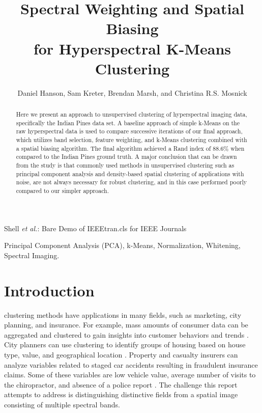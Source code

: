 \documentclass[journal]{IEEEtran}
\begin{document}
\title{Spectral Weighting and Spatial Biasing\\ for Hyperspectral K-Means Clustering}


\author{Daniel Hanson, Sam Kreter, Brendan Marsh, and Christina R.S. Mosnick}

{Shell \MakeLowercase{\textit{et al.}}: Bare Demo of IEEEtran.cls for IEEE Journals}

\maketitle

\begin{abstract}
Here we present an approach to unsupervised clustering of hyperspectral imaging data, specifically the Indian Pines data set. A baseline approach of simple k-Means on the raw hyperspectral data is used to compare successive iterations of our final approach, which utilizes band selection, feature weighting, and k-Means clustering combined with a spatial biasing algorithm. The final algorithm achieved a Rand index of 88.6\% when compared to the Indian Pines ground truth. A major conclusion that can be drawn from the study is that commonly used methods in unsupervised clustering such as principal component analysis and density-based spatial clustering of applications with noise, are not always necessary for robust clustering, and in this case performed poorly compared to our simpler approach.
\end{abstract}

\begin{IEEEkeywords}
    Principal Component Analysis (PCA), k-Means, Normalization, Whitening, Spectral Imaging.
\end{IEEEkeywords}

\IEEEpeerreviewmaketitle

\section{Introduction}

 clustering methods have applications in many fields, such as marketing, city planning, and insurance. For example, mass amounts of consumer data can be aggregated and clustered to gain insights into customer behaviors and trends \cite{ClusterTutorial}. City planners can use clustering to identify groups of housing based on house type, value, and geographical location \cite{ClusterTutorial}. Property and casualty insurers can analyze variables related to staged car accidents resulting in fraudulent insurance claims. Some of these variables are low vehicle value, average number of visits to the chiropractor, and absence of a police report \cite{FraudAnalysis}. The challenge this report attempts to address is distinguishing distinctive fields from a spatial image consisting of multiple spectral bands.\\
\end{document}
